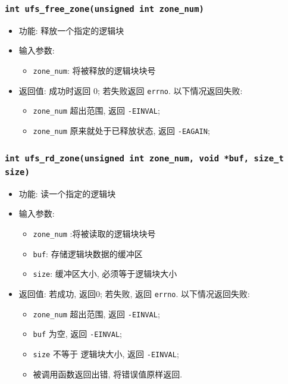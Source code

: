\documentclass[nofonts, titlepage]{ctexart}
\begin{document}
  \subsubsection[\texttt{ufs\_free\_zone}]{\texttt{int ufs\_free\_zone(unsigned int zone\_num)}}
  \begin{itemize}
\item
  功能: 释放一个指定的逻辑块
\item
  输入参数:

  \begin{itemize}
  \item
    \texttt{zone\_num}: 将被释放的逻辑块块号
  \end{itemize}
\item
  返回值: 成功时返回 0; 若失败返回 \texttt{errno}. 以下情况返回失败:

  \begin{itemize}
  \item
    \texttt{zone\_num} 超出范围, 返回 \texttt{-EINVAL};
  \item
    \texttt{zone\_num} 原来就处于已释放状态, 返回 \texttt{-EAGAIN};
  \end{itemize}
  \end{itemize}
  \subsubsection[\texttt{ufs\_rd\_zone}]{\texttt{int ufs\_rd\_zone(unsigned int zone\_num, void *buf, size\_t size)}}
  \begin{itemize}
\item
  功能: 读一个指定的逻辑块
\item
  输入参数:

  \begin{itemize}
  \item
    \texttt{zone\_num} :将被读取的逻辑块块号
  \item
    \texttt{buf}: 存储逻辑块数据的缓冲区
  \item
    \texttt{size}: 缓冲区大小, 必须等于逻辑块大小
  \end{itemize}
\item
  返回值: 若成功, 返回0; 若失败, 返回 \texttt{errno}. 以下情况返回失败:

  \begin{itemize}
  \item
    \texttt{zone\_num} 超出范围, 返回 \texttt{-EINVAL};
  \item
    \texttt{buf} 为空, 返回 \texttt{-EINVAL};
  \item
    \texttt{size} 不等于 逻辑块大小, 返回 \texttt{-EINVAL};
  \item
    被调用函数返回出错, 将错误值原样返回.
  \end{itemize}
  \end{itemize}
\end{document}
